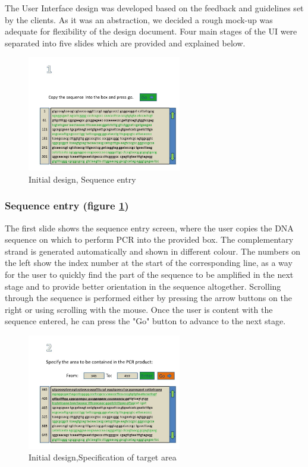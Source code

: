 The User Interface design was developed based on the feedback and
guidelines set by the clients.
As it was an abstraction, we decided a rough mock-up was adequate for
flexibility of the design document.
Four main stages of the UI were separated into five slides which are
provided and explained below.

\begin{figure}[h]
  \begin{center}
	\includegraphics[width=0.6\textwidth]{./images/UiDes/Slide1.JPG}
    \caption{
      \label{fig:UiDes:slide1}
      Initial design, Sequence entry
    }
  \end{center}
\end{figure}

\subsubsection{Sequence entry (figure \ref{fig:UiDes:slide1})}
The first slide shows the sequence entry screen, where the user copies
the DNA sequence on which to perform PCR into the provided box.
The complementary strand is generated automatically and shown in different 
colour. The numbers on the left show the index number at the start of the
corresponding line, as a way for the user to quickly find the part of
the sequence to be amplified in the next stage and to provide better
orientation in the sequence altogether.
Scrolling through the sequence is performed either by pressing the arrow buttons
on the right or using scrolling with the mouse.
Once the user is content with the sequence entered, he can press the
"Go" button to advance to the next stage.

\begin{figure}[h]
  \begin{center}
	\includegraphics[width=0.6\textwidth]{./images/UiDes/Slide2.JPG}
    \caption{
      \label{fig:UiDes:slide2}
      Initial design,Specification of target area
    }
  \end{center}
\end{figure}


